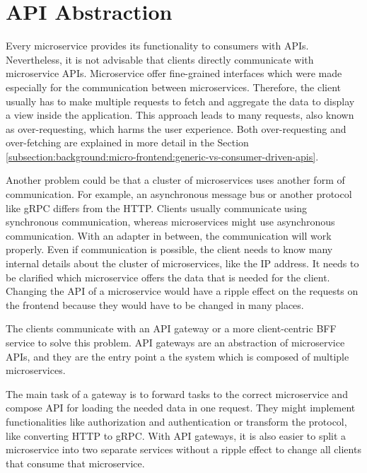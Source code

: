 \section{API Abstraction}\label{section:background:api-abstraction}

Every microservice provides its functionality to consumers with \acp{API}. Nevertheless, it is not advisable that clients directly communicate with microservice \acp{API}. Microservice offer fine-grained interfaces which were made especially for the communication between microservices. Therefore, the client usually has to make multiple requests to fetch and aggregate the data to display a view inside the application. \cite[69]{book:2021:newman:background:bff:micro-services} This approach leads to many requests, also known as over-requesting, which harms the user experience. \cite[254, 257]{book:2018:richardson:background:bff:microservices-patterns} Both over-requesting and over-fetching are explained in more detail in the Section \ref{subsection:background:micro-frontend:generic-vs-consumer-driven-apis}.

\bigskip

\noindent Another problem could be that a cluster of microservices uses another form of communication. For example, an asynchronous message bus or another protocol like \ac{gRPC} differs from the \ac{HTTP}. Clients usually communicate using synchronous communication, whereas microservices might use asynchronous communication. With an adapter in between, the communication will work properly. Even if communication is possible, the client needs to know many internal details about the cluster of microservices, like the \ac{IP} address. It needs to be clarified which microservice offers the data that is needed for the client. Changing the \ac{API} of a microservice would have a ripple effect on the requests on the frontend because they would have to be changed in many places. \cite[254-257]{book:2018:richardson:background:bff:microservices-patterns}

\bigskip

\noindent The clients communicate with an \ac{API} gateway or a more client-centric \ac{BFF} service to solve this problem. \ac{API} gateways are an abstraction of microservice \acp{API}, and they are the entry point a the system which is composed of multiple microservices. \cite[19-20]{book:2020:siriwardena:background:bff:microservice-security-in-action}

\bigskip

\noindent The main task of a gateway is to forward tasks to the correct microservice and compose \ac{API} for loading the needed data in one request. They might implement functionalities like authorization and authentication or transform the protocol, like converting \ac{HTTP} to \ac{gRPC}. With \ac{API} gateways, it is also easier to split a microservice into two separate services without a ripple effect to change all clients that consume that microservice. \cite[260-263]{book:2018:richardson:background:bff:microservices-patterns}


